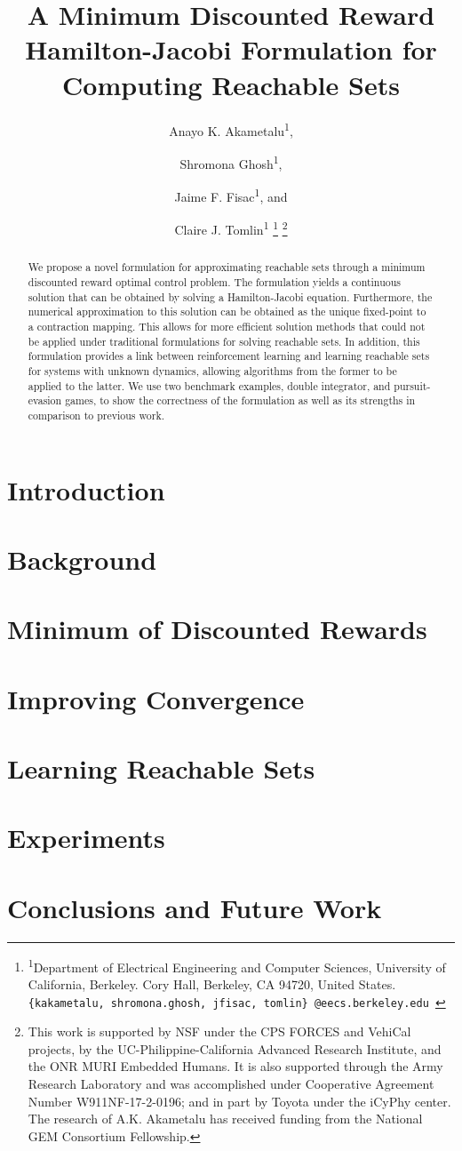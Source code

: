 \documentclass[journal,twoside,web]{ieeecolor}\onecolumnfalse
\title{\LARGE \bf
A Minimum Discounted Reward Hamilton-Jacobi Formulation for Computing Reachable Sets 
}
\author{
Anayo K. Akametalu\textsuperscript{1}, \and Shromona Ghosh\textsuperscript{1}, \and Jaime F. Fisac\textsuperscript{1}, and \and Claire J. Tomlin\textsuperscript{1}
\thanks{
\textsuperscript{1}Department of Electrical Engineering and Computer Sciences, 
        University of California, Berkeley. Cory Hall, Berkeley, CA 94720, United States.\newline
        {\tt\small \{kakametalu, shromona.ghosh, jfisac, tomlin\}~@eecs.berkeley.edu }}%
\thanks{
This work is supported by NSF under the CPS FORCES and VehiCal projects, by the UC-Philippine-California Advanced Research Institute, and the ONR MURI Embedded Humans. It is also supported through the Army Research Laboratory and was accomplished under Cooperative Agreement Number W911NF-17-2-0196; and in part by Toyota under the iCyPhy center. The research of A.K. Akametalu has received funding from the National GEM Consortium Fellowship.} 
}
\begin{document}
\maketitle
\thispagestyle{empty}
\pagestyle{empty}

\begin{abstract}
We propose a novel formulation for approximating reachable sets through a minimum discounted reward optimal control problem. The formulation yields a continuous solution that can be obtained by solving a Hamilton-Jacobi equation. Furthermore, the numerical approximation to this solution can be obtained as the unique fixed-point to a contraction mapping. This allows for more efficient solution methods that could not be applied under traditional formulations for solving reachable sets. In addition, this formulation provides a link between reinforcement learning and learning reachable sets for systems with unknown dynamics, allowing algorithms from the former to be applied to the latter. We use two benchmark examples, double integrator, and pursuit-evasion games, to show the correctness of the formulation as well as its strengths in comparison to previous work.
\end{abstract}


\section{Introduction \label{sec:intro}}


\section{Background \label{sec:back}} 


\section{Minimum of Discounted Rewards \label{sec:mdr}}


\section{Improving Convergence \label{sec:conv}}


\section{Learning Reachable Sets \label{sec:learn}}


\section{Experiments \label{sec:sim}}


\section{Conclusions and Future Work \label{sec:end}}


\printbibliography

\newpage

\end{document}
